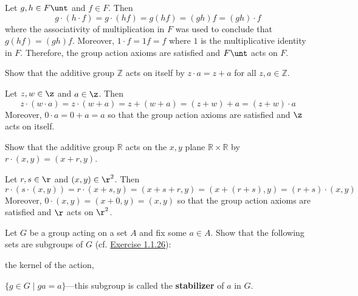 \begin{sol}
    Let $g, h \in F\unt$ and $f \in F$. Then
    \[g \cdot (h \cdot f) = g \cdot (hf) = g(hf) = (gh)f = (gh) \cdot f\]
    where the associativity of multiplication in $F$ was used to conclude that $g(hf) = (gh)f$. Moreover, $1 \cdot f = 1f = f$ where $1$ is the multiplicative identity in $F$. Therefore, the group action axioms are satisfied and $F\unt$ acts on $F$.
\end{sol}

\begin{exercise}\label{ex1.7.2}
    Show that the additive group $\mathbb{Z}$ acts on itself by $z\cdot a = z + a$ for all $z,a\in\mathbb{Z}$.
\end{exercise}

\begin{sol}
    Let $z, w \in \z$ and $a \in \z$. Then
    \[z \cdot (w \cdot a) = z \cdot (w + a) = z + (w + a) = (z + w) + a = (z + w) \cdot a\]
    Moreover, $0 \cdot a = 0 + a = a$ so that the group action axioms are satisfied and $\z$ acts on itself.
\end{sol}

\begin{exercise}\label{ex1.7.3}
    Show that the additive group $\mathbb{R}$ acts on the $x,y$ plane $\mathbb{R}\times\mathbb{R}$ by $r\cdot (x,y) = (x + r, y)$.
\end{exercise}

\begin{sol}
    Let $r, s \in \r$ and $(x, y) \in \r^2$. Then
    \[r \cdot (s \cdot (x, y)) = r \cdot (x + s, y) = (x + s + r, y) = (x + (r + s), y) = (r + s) \cdot (x, y)\]
    Moreover, $0 \cdot (x, y) = (x + 0, y) = (x, y)$ so that the group action axioms are satisfied and $\r$ acts on $\r^2$.
\end{sol}

\begin{specialexercise}[Stabilizers]\label{ex1.7.4}
    Let $G$ be a group acting on a set $A$ and fix some $a\in A$. Show that the following sets are subgroups of $G$ (cf. \hyperref[ex1.1.26]{Exercise 1.1.26}):
    \begin{subproblems}
        \item the kernel of the action,
        \item $\{g\in G \mid g a = a\}$---this subgroup is called the \textbf{stabilizer} of $a$ in $G$.
    \end{subproblems}
\end{specialexercise}

